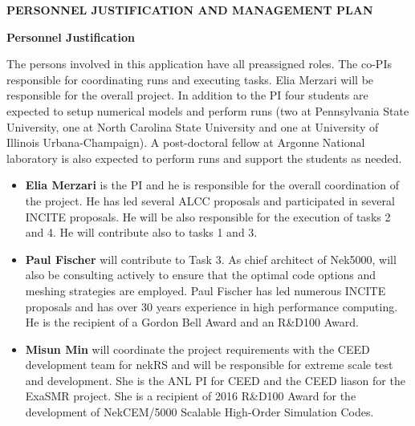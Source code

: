 \documentclass[11pt,letterpaper,english]{article}
\begin{document}
\setlength{\parindent}{0in} %

\pagestyle{fancy}   \renewcommand{%
\headrulewidth}{0.0pt}

\begin{center}
\bf {PERSONNEL JUSTIFICATION AND MANAGEMENT PLAN} \\
\end{center}

\vspace{-.25in}
\begin{flushleft}
{\noindent \bf  {Personnel Justification}}

The persons involved in this application have all preassigned roles. The co-PIs responsible for coordinating runs and executing tasks. Elia Merzari will be responsible for the overall  project. In addition to the PI four students are expected to setup numerical models and perform runs (two at Pennsylvania State University, one at North Carolina State University and one at University of Illinois Urbana-Champaign). A post-doctoral fellow at Argonne National laboratory is also expected to perform runs and support the students as needed.

\vspace{-.15in}
\begin{itemize}
\item \textbf{Elia Merzari} is the PI and he is responsible for the overall coordination of the project. He has led several ALCC proposals and participated in several INCITE proposals. He will be also responsible for the execution of tasks 2 and 4. He will contribute also to tasks 1 and 3.
\item \textbf{Paul Fischer} will contribute to Task 3. As chief architect of Nek5000, will also be  consulting actively to ensure that the optimal code options and meshing strategies are employed. Paul Fischer has led numerous INCITE proposals and has over 30 years experience in high performance computing. He is the recipient of a Gordon Bell Award and an R\&D100 Award.

\item \textbf{Misun Min} will coordinate the project requirements with the CEED development team for nekRS and will be responsible for extreme scale test and development.
She is the ANL PI for CEED and the CEED liason for the ExaSMR project. She is a recipient of 2016 R\&D100 Award for the development of NekCEM/5000 Scalable High-Order Simulation Codes.


\end{itemize}
\end{flushleft}
\end{document}
